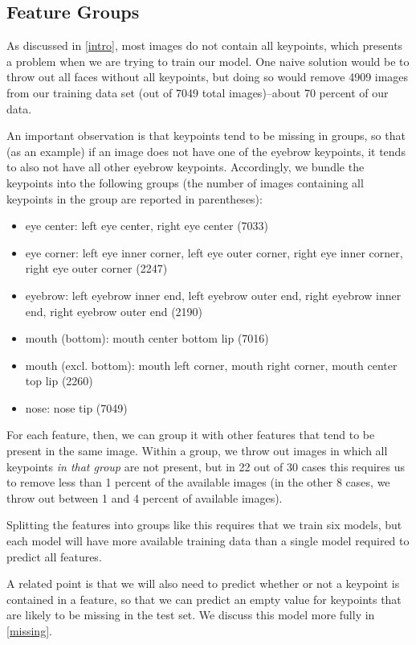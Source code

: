 \documentclass[journal]{IEEEtran}
\begin{document}
\subsection{Feature Groups}

As discussed in \cref{intro}, most images do not contain all keypoints, which presents a problem when we are trying to train our model. One naive solution would be to throw out all faces without all keypoints, but doing so would remove 4909 images from our training data set (out of 7049 total images)--about 70 percent of our data.

An important observation is that keypoints tend to be missing in groups, so that (as an example) if an image does not have one of the eyebrow keypoints, it tends to also not have all other eyebrow keypoints. Accordingly, we bundle the keypoints into the following groups (the number of images containing all keypoints in the group are reported in parentheses):
\begin{itemize}
\item eye center: left eye center, right eye center (7033)
\item eye corner: left eye inner corner, left eye outer corner, right eye inner corner, right eye outer corner (2247)
\item eyebrow: left eyebrow inner end, left eyebrow outer end, right eyebrow inner end, right eyebrow outer end (2190)
\item mouth (bottom): mouth center bottom lip (7016)
\item mouth (excl. bottom): mouth left corner, mouth right corner, mouth center top lip (2260)
\item nose: nose tip (7049)
\end{itemize}
For each feature, then, we can group it with other features that tend to be present in the same image. Within a group, we throw out images in which all keypoints \textit{in that group} are not present, but in 22 out of 30 cases this requires us to remove less than 1 percent of the available images (in the other 8 cases, we throw out between 1 and 4 percent of available images).

Splitting the features into groups like this requires that we train six models, but each model will have more available training data than a single model required to predict all features. 

A related point is that we will also need to predict whether or not a keypoint is contained in a feature, so that we can predict an empty value for keypoints that are likely to be missing in the test set. We discuss this model more fully in \cref{missing}.
\end{document}
